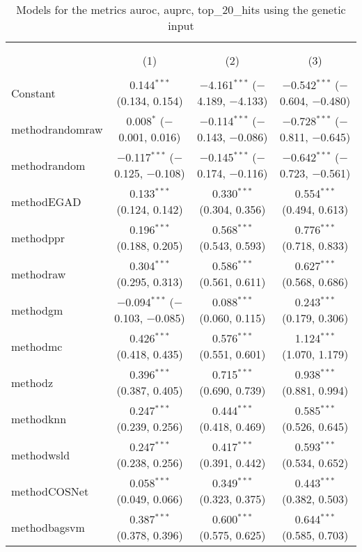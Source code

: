 
\begin{table}[!htbp] \centering 
  \caption{Models for the metrics auroc, auprc, top_20_hits using the genetic input} 
  \label{} 
\begin{tabular}{@{\extracolsep{5pt}}lccc} 
\\[-1.8ex]\hline 
\hline \\[-1.8ex] 
\\[-1.8ex] & (1) & (2) & (3)\\ 
\hline \\[-1.8ex] 
 Constant & 0.144$^{***}$ (0.134, 0.154) & $-$4.161$^{***}$ ($-$4.189, $-$4.133) & $-$0.542$^{***}$ ($-$0.604, $-$0.480) \\ 
  methodrandomraw & 0.008$^{*}$ ($-$0.001, 0.016) & $-$0.114$^{***}$ ($-$0.143, $-$0.086) & $-$0.728$^{***}$ ($-$0.811, $-$0.645) \\ 
  methodrandom & $-$0.117$^{***}$ ($-$0.125, $-$0.108) & $-$0.145$^{***}$ ($-$0.174, $-$0.116) & $-$0.642$^{***}$ ($-$0.723, $-$0.561) \\ 
  methodEGAD & 0.133$^{***}$ (0.124, 0.142) & 0.330$^{***}$ (0.304, 0.356) & 0.554$^{***}$ (0.494, 0.613) \\ 
  methodppr & 0.196$^{***}$ (0.188, 0.205) & 0.568$^{***}$ (0.543, 0.593) & 0.776$^{***}$ (0.718, 0.833) \\ 
  methodraw & 0.304$^{***}$ (0.295, 0.313) & 0.586$^{***}$ (0.561, 0.611) & 0.627$^{***}$ (0.568, 0.686) \\ 
  methodgm & $-$0.094$^{***}$ ($-$0.103, $-$0.085) & 0.088$^{***}$ (0.060, 0.115) & 0.243$^{***}$ (0.179, 0.306) \\ 
  methodmc & 0.426$^{***}$ (0.418, 0.435) & 0.576$^{***}$ (0.551, 0.601) & 1.124$^{***}$ (1.070, 1.179) \\ 
  methodz & 0.396$^{***}$ (0.387, 0.405) & 0.715$^{***}$ (0.690, 0.739) & 0.938$^{***}$ (0.881, 0.994) \\ 
  methodknn & 0.247$^{***}$ (0.239, 0.256) & 0.444$^{***}$ (0.418, 0.469) & 0.585$^{***}$ (0.526, 0.645) \\ 
  methodwsld & 0.247$^{***}$ (0.238, 0.256) & 0.417$^{***}$ (0.391, 0.442) & 0.593$^{***}$ (0.534, 0.652) \\ 
  methodCOSNet & 0.058$^{***}$ (0.049, 0.066) & 0.349$^{***}$ (0.323, 0.375) & 0.443$^{***}$ (0.382, 0.503) \\ 
  methodbagsvm & 0.387$^{***}$ (0.378, 0.396) & 0.600$^{***}$ (0.575, 0.625) & 0.644$^{***}$ (0.585, 0.703) \\ 

\end{tabular}
\end{table}
